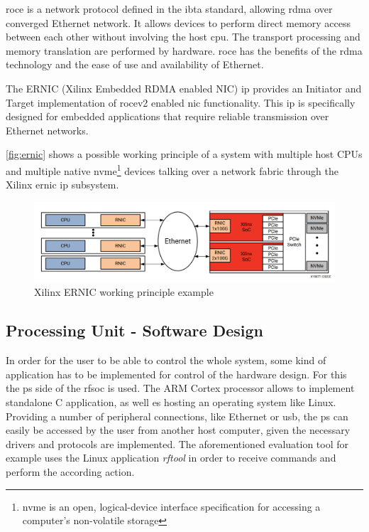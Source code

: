 \Gls{roce} is a network protocol defined in the \gls{ibta} standard, allowing \gls{rdma} over converged Ethernet network. 
It allows devices to perform direct memory access between each other without involving the host \gls{cpu}. 
The transport processing and memory translation are performed by hardware. 
\Gls{roce} has the benefits of the \gls{rdma} technology and the ease of use and availability of Ethernet.

The ERNIC (Xilinx Embedded RDMA enabled NIC) \gls{ip} provides an Initiator and Target  implementation of \gls{rocev2} enabled \gls{nic} functionality. This \gls{ip} is specifically designed for embedded applications that require reliable transmission over Ethernet networks.

\autoref{fig:ernic} shows a possible working principle of a system with multiple host CPUs and multiple native \gls{nvme}\footnote{ \gls{nvme} is an open, logical-device interface specification for accessing a computer's non-volatile storage} devices talking over a network fabric through the Xilinx \gls{ernic} \gls{ip}
subsystem.

\begin{figure}[H]
	\centering
	\includegraphics[width = \textwidth]{chap/05-readout/img/ernic}
	\caption{Xilinx ERNIC working principle example}
	\label{fig:ernic}
\end{figure}

\subsection{Processing Unit - Software Design}
In order for the user to be able to control the whole system, some kind of application has to be implemented for control of the hardware design.
For this the \gls{ps} side of the \gls{rfsoc} is used. 
The ARM Cortex processor allows to implement standalone C application, as well es hosting an operating system like Linux. 
Providing a number of peripheral connections, like Ethernet or \gls{usb}, the \gls{ps} can easily be accessed by the user from another host computer, given the necessary drivers and protocols are implemented. %
The aforementioned evaluation tool for example uses the Linux application \textit{rftool} in order to receive commands and perform the according action.



